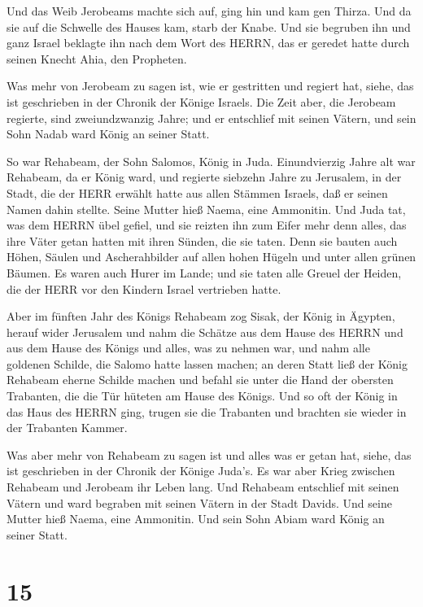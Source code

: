  Und das Weib Jerobeams machte sich auf, ging hin und kam
gen Thirza. Und da sie auf die Schwelle des Hauses kam, starb der Knabe.
 Und sie begruben ihn und ganz Israel beklagte ihn nach dem
Wort des HERRN, das er geredet hatte durch seinen Knecht Ahia, den
Propheten.

 Was mehr von Jerobeam zu sagen ist, wie er gestritten und
regiert hat, siehe, das ist geschrieben in der Chronik der Könige
Israels.  Die Zeit aber, die Jerobeam regierte, sind
zweiundzwanzig Jahre; und er entschlief mit seinen Vätern, und sein Sohn
Nadab ward König an seiner Statt.

 So war Rehabeam, der Sohn Salomos, König in Juda.
Einundvierzig Jahre alt war Rehabeam, da er König ward, und regierte
siebzehn Jahre zu Jerusalem, in der Stadt, die der HERR erwählt hatte
aus allen Stämmen Israels, daß er seinen Namen dahin stellte. Seine
Mutter hieß Naema, eine Ammonitin.  Und Juda tat, was dem
HERRN übel gefiel, und sie reizten ihn zum Eifer mehr denn alles, das
ihre Väter getan hatten mit ihren Sünden, die sie taten. 
Denn sie bauten auch Höhen, Säulen und Ascherahbilder auf allen hohen
Hügeln und unter allen grünen Bäumen.  Es waren auch Hurer
im Lande; und sie taten alle Greuel der Heiden, die der HERR vor den
Kindern Israel vertrieben hatte.

 Aber im fünften Jahr des Königs Rehabeam zog Sisak, der
König in Ägypten, herauf wider Jerusalem  und nahm die
Schätze aus dem Hause des HERRN und aus dem Hause des Königs und alles,
was zu nehmen war, und nahm alle goldenen Schilde, die Salomo hatte
lassen machen;  an deren Statt ließ der König Rehabeam
eherne Schilde machen und befahl sie unter die Hand der obersten
Trabanten, die die Tür hüteten am Hause des Königs.  Und so
oft der König in das Haus des HERRN ging, trugen sie die Trabanten und
brachten sie wieder in der Trabanten Kammer.

 Was aber mehr von Rehabeam zu sagen ist und alles was er
getan hat, siehe, das ist geschrieben in der Chronik der Könige Juda's.
 Es war aber Krieg zwischen Rehabeam und Jerobeam ihr Leben
lang.  Und Rehabeam entschlief mit seinen Vätern und ward
begraben mit seinen Vätern in der Stadt Davids. Und seine Mutter hieß
Naema, eine Ammonitin. Und sein Sohn Abiam ward König an seiner Statt.

\hypertarget{section-14}{%
\section{15}\label{section-14}}

